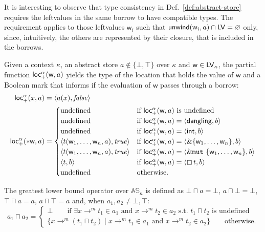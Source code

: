 \noindent
It is interesting to observe that type consistency in Def.~\ref{def:abstract-store}
requires the leftvalues in the same borrow to have compatible types.
The requirement applies to those leftvalues $\mathsf{w}_i$
such that $\mathsf{unwind}(\mathsf{w}_i,a)\cap\mathsf{LV}=\varnothing$ only,
since, intuitively, the others are represented by their closure, that
is included in the borrows.

\begin{definition}\label{def:locreada}
  Given a context $\kappa$, an abstract store $a\not\in\{\bot,\top\}$ over $\kappa$
  and $\mathsf{w}\in\mathsf{LV}_\kappa$, the partial function
  $\mathsf{loc_+^\alpha}(\mathsf{w},a)$ yields the type of the location that holds the value of $\mathsf{w}$
  and a Boolean mark that informs if the evaluation of $\mathsf{w}$ passes through a borrow:
  \begin{align*}
    \mathsf{loc_+^\alpha}(x,a)&=\langle a(x),\mathit{false}\rangle\\
    \mathsf{loc_+^\alpha}(*\mathsf{w},a)&=\begin{cases}
    \text{undefined} & \text{if $\mathsf{loc_+^\alpha}(\mathsf{w},a)$ is undefined}\\
    \text{undefined} & \text{if $\mathsf{loc_+^\alpha}(\mathsf{w},a)=\langle\mathsf{dangling},b\rangle$}\\
    \text{undefined} & \text{if $\mathsf{loc_+^\alpha}(\mathsf{w},a)=\langle\mathsf{int},b\rangle$}\\
    \langle t(\mathsf{w}_1,\ldots,\mathsf{w}_n,a),\mathit{true}\rangle & \text{if $\mathsf{loc_+^\alpha}(\mathsf{w},a)=\langle\&\{\mathsf{w}_1,\ldots,\mathsf{w}_n\},b\rangle$}\\
    \langle t(\mathsf{w}_1,\ldots,\mathsf{w}_n,a),\mathit{true}\rangle & \text{if $\mathsf{loc_+^\alpha}(\mathsf{w},a)=\langle\&\mathtt{mut}\ \{\mathsf{w}_1,\ldots,\mathsf{w}_n\},b\rangle$}\\
    \langle t,b\rangle & \text{if $\mathsf{loc_+^\alpha}(\mathsf{w},a)=\langle\boxempty\,{t},b\rangle$}\\
    \text{undefined} & \text{otherwise.}
    \end{cases}
  \end{align*}
\end{definition}

\begin{definition}
  The greatest lower bound operator over $\mathbb{AS}_\kappa$ is defined as
  $\bot\sqcap a=\bot$, $a\sqcap \bot=\bot$, $\top\sqcap a=a$, $a\sqcap\top=a$ and,
  when $a_1,a_2\not=\bot,\top$:
  \[
  a_1\sqcap a_2=\begin{cases}
  \bot\qquad\text{if $\exists x\to^m t_1\in a_1$ and $x\to^m t_2\in a_2$ s.t.\ $t_1\sqcap t_2$ is undefined}\\
  \{x\to^m(t_1\sqcap t_2)\mid x\to^m t_1\in a_1\text{ and }x\to^m t_2\in a_2\}\qquad\text{otherwise.}
  \end{cases}
  \]
\end{definition}

